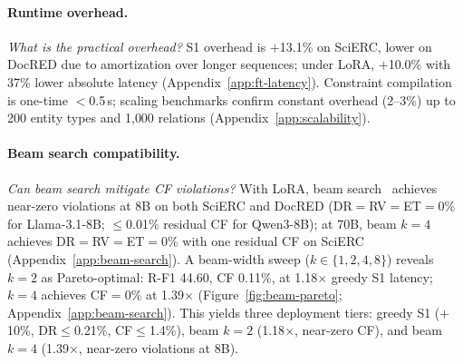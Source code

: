 
\paragraph{Runtime overhead.}
\label{sec:runtime}
\emph{What is the practical overhead?}
S1 overhead is $+$13.1\% on SciERC, lower on DocRED due to amortization over longer sequences; under LoRA, $+$10.0\% with 37\% lower absolute latency (Appendix~\ref{app:ft-latency}).
Constraint compilation is one-time $<$0.5\,s; scaling benchmarks confirm constant overhead (2--3\%) up to 200 entity types and 1{,}000 relations (Appendix~\ref{app:scalability}).

\paragraph{Beam search compatibility.}
\label{sec:beam-results}
\emph{Can beam search mitigate CF violations?}
With LoRA, beam search~\cite{anderson2017guided} achieves near-zero violations at 8B on both SciERC and DocRED (DR${=}$RV${=}$ET${=}$0\% for Llama-3.1-8B; $\leq$0.01\% residual CF for Qwen3-8B); at 70B, beam $k{=}4$ achieves DR${=}$RV${=}$ET${=}$0\% with one residual CF on SciERC (Appendix~\ref{app:beam-search}).
A beam-width sweep ($k \in \{1,2,4,8\}$) reveals $k{=}2$ as Pareto-optimal: R-F1 44.60, CF 0.11\%, at 1.18$\times$ greedy S1 latency; $k{=}4$ achieves CF${=}$0\% at 1.39$\times$ (Figure~\ref{fig:beam-pareto}; Appendix~\ref{app:beam-search}).
This yields three deployment tiers: greedy S1 ($+$10\%, DR${\leq}$0.21\%, CF${\leq}$1.4\%), beam $k{=}2$ (1.18$\times$, near-zero CF), and beam $k{=}4$ (1.39$\times$, near-zero violations at 8B).

